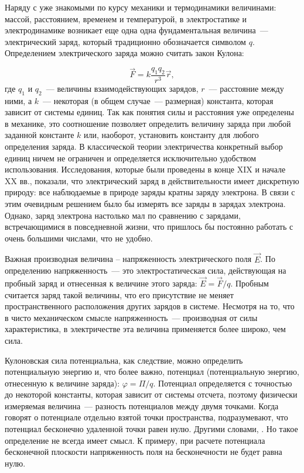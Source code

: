

Наряду с уже знакомыми по курсу механики и термодинамики величинами: массой, расстоянием, временем и температурой, в электростатике и электродинамике возникает еще одна одна фундаментальная величина~--- электрический заряд, который традиционно обозначается символом $q$. Определением электрического заряда можно считать закон Кулона:

\begin{equation}
	\vec{F} = k \frac{q_1 q_2}{r^3}\vec{r},
\end{equation}
где $q_1$ и $q_2$~--- величины взаимодействующих зарядов, $r$~--- расстояние между ними, а $k$~--- некоторая (в общем случае~--- размерная) константа, которая зависит от системы единиц. Так как понятия силы и расстояния уже определены в механике, это соотношение позволяет определить величину заряда при любой заданной константе $k$ или, наоборот, установить константу для любого определения заряда. В классической теории электричества конкретный выбор единиц ничем не ограничен и определяется исключительно удобством использования. Исследования, которые были проведены в конце XIX и начале XX вв., показали, что электрический заряд в действительности имеет дискретную природу: все наблюдаемые в природе заряды кратны заряду электрона. В связи с этим очевидным решением было бы измерять все заряды в зарядах электрона. Однако, заряд электрона настолько мал по сравнению с зарядами, встречающимися в повседневной жизни, что пришлось бы постоянно работать с очень большими числами, что не удобно.

Важная производная величина -- напряженность электрического поля $\vec{E}$. По определению напряженность~--- это электростатическая сила, действующая на пробный заряд и отнесенная к величине этого заряда: $\vec{E} = \vec{F}/q$. Пробным считается заряд такой величины, что его присутствие не меняет пространственного расположения других зарядов в системе. Несмотря на то, что в чисто механическом смысле напряженность~--- производная от силы характеристика, в электричестве эта величина применяется более широко, чем сила.

Кулоновская сила потенциальна, как следствие, можно определить потенциальную энергию и, что более важно, потенциал (потенциальную энергию, отнесенную к величине заряда): $\varphi = \Pi/q$. Потенциал определяется с точностью до некоторой константы, которая зависит от системы отсчета, поэтому физически измеряемая величина~--- разность потенциалов между двумя точками. Когда говорят о потенциале отдельно взятой точки пространства, подразумевают, что потенциал бесконечно удаленной точки равен нулю. Другими словами, . Но такое определение не всегда имеет смысл. К примеру, при расчете потенциала бесконечной плоскости напряженность поля на бесконечности не будет равна нулю.

